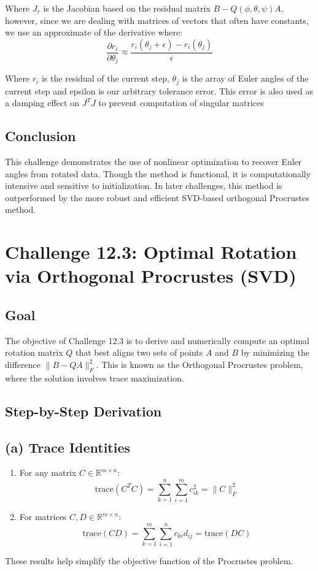 \documentclass[12pt]{article}
\begin{document}
Where $J_r$ is the Jacobian based on the residual matrix $ B - Q(\phi, \theta, \psi)A$, however, since we are dealing with matrices of vectors that often have constants, we use an approximate of the derivative where:
\[\frac{\partial r_i}{\partial \theta_j} \approx \frac{r_i(\theta_j + \epsilon) - r_i(\theta_j)}{\epsilon}\] \]

Where $r_i$ is the residual of the current step, $\theta_j$ is the array of Euler angles of the current step and epsilon is our arbitrary tolerance error. This error is also used as a damping effect on $J^TJ$ to prevent computation of singular matrices

\subsection*{Conclusion}
This challenge demonstrates the use of nonlinear optimization to recover Euler angles from rotated data. Though the method is functional, it is computationally intensive and sensitive to initialization. In later challenges, this method is outperformed by the more robust and efficient SVD-based orthogonal Procrustes method.


\section*{Challenge 12.3: Optimal Rotation via Orthogonal Procrustes (SVD)}

\subsection*{Goal}
The objective of Challenge 12.3 is to derive and numerically compute an optimal rotation matrix \( Q \) that best aligns two sets of points \( A \) and \( B \) by minimizing the difference \( \| B - QA \|_F^2 \). This is known as the Orthogonal Procrustes problem, where the solution involves trace maximization.

\subsection*{Step-by-Step Derivation}

\subsection*{(a) Trace Identities}
\begin{enumerate}
    \item For any matrix \( C \in \mathbb{R}^{m \times n} \):
    \[
    \text{trace}(C^T C) = \sum_{k=1}^{n} \sum_{i=1}^{m} c_{ik}^2 = \| C \|_F^2
    \]
    \item For matrices \( C, D \in \mathbb{R}^{m \times n} \):
    \[
    \text{trace}(CD) = \sum_{k=1}^{m} \sum_{i=1}^{n} c_{ki} d_{ij} = \text{trace}(DC)
    \]
\end{enumerate}
These results help simplify the objective function of the Procrustes problem.
\end{document}
